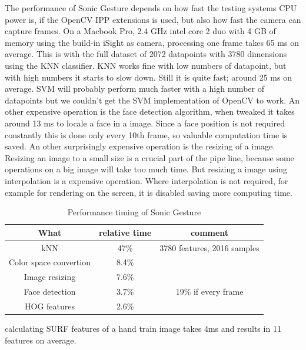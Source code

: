 The performance of Sonic Gesture depends on how fast the testing systems CPU power is, if the OpenCV IPP extensions is used, but also how fast the camera can capture frames. On a Macbook Pro, 2.4 GHz intel core 2 duo with 4 GB of memory using the build-in iSight as camera, processing one frame takes 65 ms on average. This is with the full dataset of 2072 datapoints with 3780 dimensions using the KNN classifier. KNN works fine with low numbers of datapoint, but with high numbers it starts to slow down. Still it is quite fast; around 25 ms on average. SVM will probably perform much faster with a high number of datapoints but we couldn't get the SVM implementation of OpenCV to work. An other expensive operation is the face detection algorithm, when tweaked it takes around 13 ms to locale a face in a image. Since a face position is not required constantly this is done only every 10th frame, so valuable computation time is saved. An other surprisingly expensive operation is the resizing of a image. Resizing an image to a small size is a crucial part of the pipe line, because some operations on a big image will take too much time. But resizing a image using interpolation is a expensive operation. Where interpolation is not required, for example for rendering on the screen, it is disabled saving more computing time. 



\begin{table}
\centering
\begin{tabular}{ccc}
What & relative time & comment \\
\hline
kNN & 47\% & 3780 features, 2016 samples \\
Color space convertion & 8.4\% & \\
Image resizing & 7.6\% & \\
Face detection & 3.7\% &  19\% if every frame \\
HOG features & 2.6\% \\
\end{tabular}
\caption{Performance timing of Sonic Gesture}
\end{table}

calculating SURF features of a hand train image takes 4ms and results in 11 features on average.